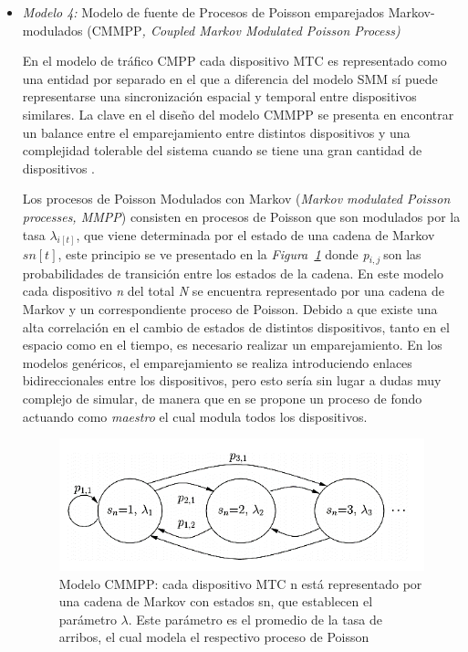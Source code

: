 \begin{itemize}
\item  \textit{Modelo 4:} Modelo de fuente de Procesos de Poisson emparejados Markov-modulados (CMMPP\textit{, Coupled Markov Modulated Poisson Process)}

En el modelo de tráfico CMPP cada dispositivo MTC es representado como una entidad por separado en el que a diferencia del modelo SMM sí puede representarse una sincronización espacial y temporal entre dispositivos similares. La clave en el diseño del modelo CMMPP se presenta en encontrar un balance entre el emparejamiento entre distintos dispositivos y una complejidad tolerable del sistema cuando se tiene una gran cantidad de dispositivos \parencite{Gupta2018}.

Los procesos de Poisson Modulados con Markov (\textit{Markov modulated Poisson processes, MMPP}) consisten en procesos de Poisson que son modulados por la tasa $\lambda_{i[t]}$, que viene determinada por el estado de una cadena de Markov $sn[t]$, este principio se ve presentado en la \textit{Figura~\ref{fig:CMMPP}} donde \textit{p${}_{i,j}$}${}_{\ }$son las probabilidades de transición entre los estados de la cadena. En este modelo cada dispositivo \textit{n} del total\textit{ N} se encuentra representado por una cadena de Markov y un correspondiente proceso de Poisson. Debido a que existe una alta correlación en el cambio de estados de distintos dispositivos, tanto en el espacio como en el tiempo, es necesario realizar un emparejamiento. En los modelos genéricos, el emparejamiento se realiza introduciendo enlaces bidireccionales entre los dispositivos, pero esto sería sin lugar a dudas muy complejo de simular, de manera que en \parencite{Gupta2018} se propone un proceso de fondo actuando como \textit{maestro} el cual modula todos los dispositivos.

\begin{figure}[th]
\centering
\includegraphics[scale=1]{Figures/Modelo MMPP en dispositivos MTC}
\decoRule
\caption[Modelo CMMPP en dispositivos MTC]{Modelo CMMPP: cada dispositivo MTC n está representado por una cadena de Markov con estados sn, que establecen el parámetro $\lambda$. Este parámetro es el promedio de la tasa de arribos, el cual modela el respectivo proceso de Poisson}
\label{fig:CMMPP}
\end{figure}

\end{itemize}

